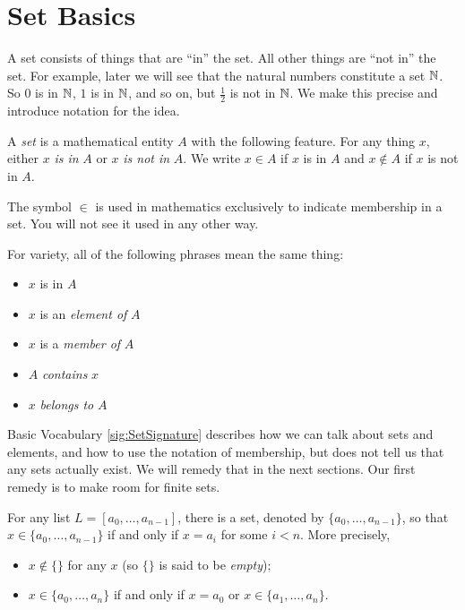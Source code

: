\section{Set Basics}

A set consists of things that are ``in'' the set. All other things are ``not in'' the set. 
For example, later we will see that the natural numbers constitute a set $\mathbb N$. 
So $0$ is in $\mathbb N$, $1$ is in $\mathbb N$, and so on, but $\frac{1}2$ is not in $\mathbb N$.
We make this precise and introduce notation for the idea.

\begin{signature}\label{sig:SetSignature}
  A \emph{set} is a mathematical entity $A$ with the following feature. 
  For any thing $x$, either $x$ \emph{is in} $A$ or $x$ \emph{is not in} $A$. 
  We write $x\in A$ if $x$ is in $A$ and $x\notin A$ if $x$ is not in $A$.

The symbol $\in$ is used in mathematics exclusively to indicate membership in a set. 
You will not see it used in any other way.  

For variety, all of the following phrases mean the same thing:
\begin{itemize}
\item $x$ is in $A$
\item $x$ is an \emph{element of} $A$
\item $x$  is a \emph{member of} $A$
\item $A$ \emph{contains} $x$
\item $x$ \emph{belongs to} $A$
\end{itemize}
\end{signature}

Basic Vocabulary \ref{sig:SetSignature} describes how we can talk about sets and elements, and how to use the notation of membership, but does not tell us that any sets actually exist. 
We will remedy that in the next sections.
Our first remedy is to make room for finite sets.

\begin{principle} For any list $L  = [a_0,\ldots, a_{n-1}]$, there is a set, denoted by $\{a_0,\ldots,a_{n-1}\}$, so
  that $x\in \{a_0,\ldots, a_{n-1}\}$ if and only if $x=a_i$ for some
  $i<n$.  More precisely,
  \begin{itemize}
  \item $x\notin \{\}$ for any $x$ (so $\{\}$ is said to be \emph{empty});
  \item $x\in \{a_0,\ldots,a_n\}$ if and only if $x=a_0$ or $x\in
    \{a_1,\ldots,a_n\}$.
  \end{itemize}
\end{principle}


